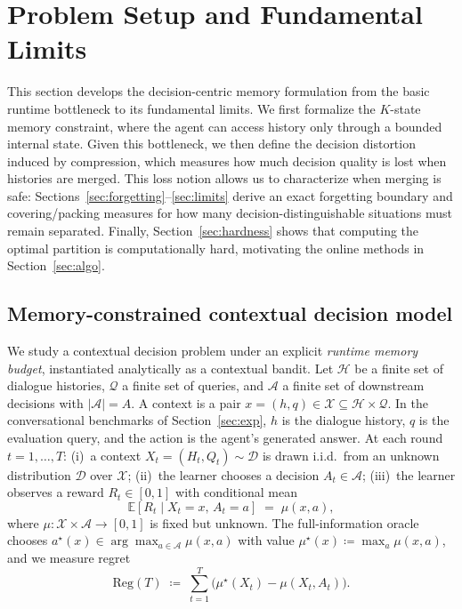 \documentclass{article}
\theoremstyle{plain}
\theoremstyle{definition}
\theoremstyle{remark}
\newcommand{\cA}{\mathcal{A}}
\newcommand{\cX}{\mathcal{X}}
\newcommand{\cD}{\mathcal{D}}
\newcommand{\EE}{\mathbb{E}}
\newcommand{\Reg}{\mathrm{Reg}}
\begin{document}
\section{Problem Setup and Fundamental Limits}
\label{sec:setup}
\vspace{-0.5em}
This section develops the decision-centric memory formulation from the basic
runtime bottleneck to its fundamental limits. We first formalize the \(K\)-state memory constraint, where the agent can
access history only through a bounded internal state. Given this bottleneck, we then define the decision distortion induced by
compression, which measures how much decision quality is lost when histories are
merged. This loss notion allows us to characterize when merging is safe: Sections~\ref{sec:forgetting}--\ref{sec:limits} derive an exact forgetting boundary and
covering/packing measures for how many decision-distinguishable situations must
remain separated. Finally, Section~\ref{sec:hardness} shows that computing the
optimal partition is computationally hard, motivating the online methods in
Section~\ref{sec:algo}.
\vspace{-0.3em}
\subsection{Memory-constrained contextual decision model}
\label{sec:model}
\vspace{-0.3em}
We study a contextual decision problem under an explicit \emph{runtime memory budget}, instantiated analytically as a contextual bandit.
Let $\mathcal{H}$ be a finite set of dialogue histories, $\mathcal{Q}$ a finite set of queries, and $\cA$ a finite set of downstream decisions with $|\cA|=A$.
A context is a pair $x=(h,q)\in\cX\subseteq\mathcal{H}\times\mathcal{Q}$.
In the conversational benchmarks of Section~\ref{sec:exp}, $h$ is the dialogue history, $q$ is the evaluation query, and the action is the agent's generated answer.
At each round $t=1,\dots,T$:
(i)~a context $X_t=(H_t,Q_t)\sim\cD$ is drawn i.i.d.\ from an unknown distribution $\cD$ over $\cX$;
(ii)~the learner chooses a decision $A_t\in\cA$;
(iii)~the learner observes a reward $R_t\in[0,1]$ with conditional mean
\begin{equation}
\label{eq:mean-reward}
\EE[R_t \mid X_t=x,\, A_t=a] \;=\; \mu(x,a),
\end{equation}
where $\mu:\cX\times\cA\to[0,1]$ is fixed but unknown.
The full-information oracle chooses
$a^\star(x)\in\arg\max_{a\in\cA}\mu(x,a)$
with value $\mu^\star(x)\coloneqq \max_{a}\mu(x,a)$, and we measure regret
\begin{equation}
\label{eq:regret}
\Reg(T)\;\coloneqq\; \sum_{t=1}^{T}\bigl(\mu^\star(X_t)-\mu(X_t,A_t)\bigr).
\end{equation}
\end{document}
